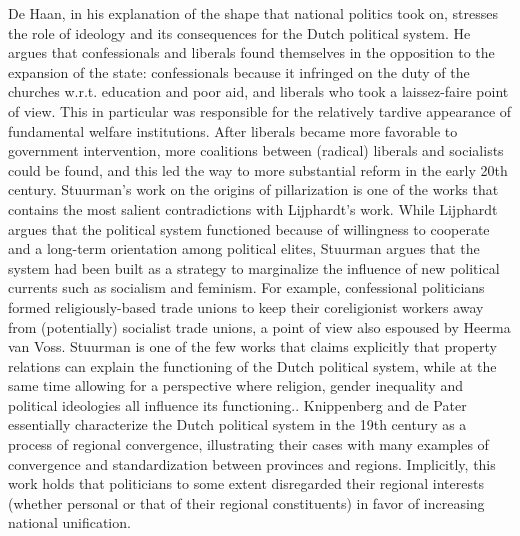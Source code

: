     De Haan, in his explanation of the shape that national politics took on, stresses the role of ideology and its consequences for the Dutch political system.\autocite[p. 194]{de2003het} He argues that confessionals and liberals found themselves in the opposition to the expansion of the state: confessionals because it infringed on the duty of the churches w.r.t. education and poor aid, and liberals who took a laissez-faire point of view. This in particular was responsible for the relatively tardive appearance of fundamental welfare institutions. After liberals became more favorable to government intervention, more coalitions between (radical) liberals and socialists could be found, and this led the way to more substantial reform in the early 20th century. Stuurman’s work on the origins of pillarization is one of the works that contains the most salient contradictions with Lijphardt’s work.\autocite{stuurman1983verzuiling} While Lijphardt argues that the political system functioned because of willingness to cooperate and a long-term orientation among political elites, Stuurman argues that the system had been built as a strategy to marginalize the influence of new political currents such as socialism and feminism.  For example, confessional politicians formed religiously-based trade unions to keep their coreligionist workers away from (potentially) socialist trade unions, a point of view also espoused by Heerma van Voss.\autocite{heerma2000rode} Stuurman is one of the few works that claims explicitly that property relations can explain the functioning of the Dutch political system, while at the same time allowing for a perspective where religion, gender inequality and political ideologies all influence its functioning.\autocite[p.335]{stuurman1983verzuiling}. Knippenberg and de Pater essentially characterize the Dutch political system in the 19th century as a process of regional convergence, illustrating their cases with many examples of convergence and standardization between provinces and regions.\autocite{knippenberg2000eenwording}  Implicitly, this work holds that politicians to some extent disregarded their regional interests (whether personal or that of their regional constituents) in favor of increasing national unification. 
    

